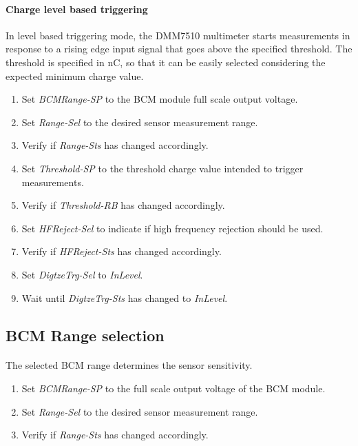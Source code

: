 \documentclass[openany]{article}
\begin{document}
		\paragraph{Charge level based triggering} In level based triggering mode, the DMM7510 multimeter starts measurements in response to a rising edge input signal that goes above the specified threshold. The threshold is specified in nC, so that it can be easily selected considering the expected minimum charge value.

			\begin{enumerate}
			\item Set \emph{BCMRange-SP} to the BCM module full scale output voltage.
			\item Set \emph{Range-Sel} to the desired sensor measurement range.
			\item Verify if \emph{Range-Sts} has changed accordingly.
			\item Set \emph{Threshold-SP} to the threshold charge value intended to trigger measurements.
			\item Verify if \emph{Threshold-RB} has changed accordingly.
			\item Set \emph{HFReject-Sel} to indicate if high frequency rejection should be used.
			\item Verify if \emph{HFReject-Sts} has changed accordingly.
			\item Set \emph{DigtzeTrg-Sel} to \emph{InLevel}.
			\item Wait until \emph{DigtzeTrg-Sts} has changed to \emph{InLevel}.
			\end{enumerate}

	\subsection{BCM Range selection}

		\paragraph{} The selected BCM range determines the sensor sensitivity.

			\begin{enumerate}
			\item Set \emph{BCMRange-SP} to the full scale output voltage of the BCM module.
			\item Set \emph{Range-Sel} to the desired sensor measurement range.
			\item Verify if \emph{Range-Sts} has changed accordingly.
			\end{enumerate}
\end{document}
